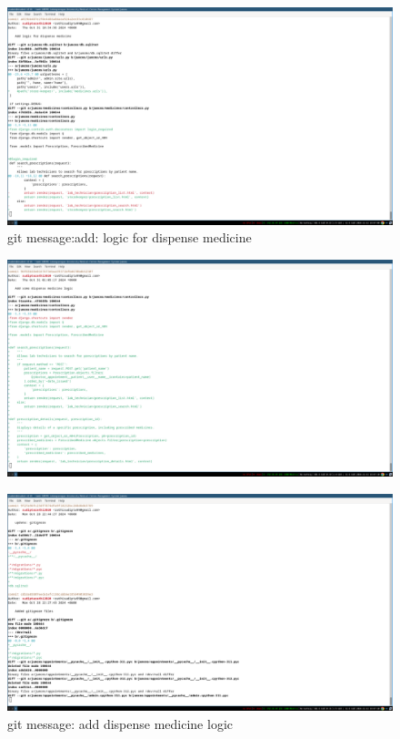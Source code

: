 \documentclass[a4paper,12pt]{article}
\begin{document}
\begin{figure}[H]
    \centering
    \includegraphics[width=\textwidth]{images/spr1meet36.png}
    \caption{git message:add: logic for dispense medicine}
\end{figure}


\begin{figure}[H]
    \centering
    \includegraphics[width=\textwidth]{images/spr1meet37.png}
    \caption{}
\end{figure}


\begin{figure}[H]
    \centering
    \includegraphics[width=\textwidth]{images/spr1meet38.png}
    \caption{git message: add dispense medicine logic}
\end{figure}
\end{document}
